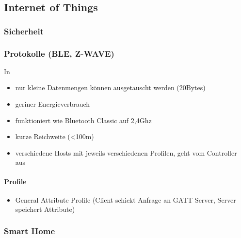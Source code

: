 \subsection{Internet of Things}
\label{sec:sota_iot}
\subsubsection{Sicherheit}
\label{sec:sota_iot_security}
\subsubsection{Protokolle (BLE, Z-WAVE)}

    In \cite{Rose2016}
    \begin{itemize}
        \item nur kleine Datenmengen können ausgetauscht werden (20Bytes)\cite{Rose2016}
        \item geriner Energieverbrauch
        \item funktioniert wie Bluetooth Classic auf 2,4Ghz
        \item kurze Reichweite (<100m)
        \item verschiedene Hosts mit jeweils verschiedenen Profilen, geht vom Controller aus
    \end{itemize}
    
    \paragraph{Profile}\cite{Rose2016}
        \begin{itemize}
            \item General Attribute Profile (Client schickt Anfrage an GATT Server, Server speichert Attribute)
        \end{itemize}

\label{sec:sota_iot_protocols}
\subsubsection{Smart Home}
\label{sec:sota_iot_smart_home}